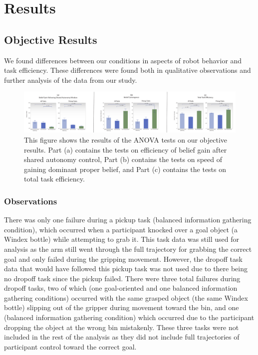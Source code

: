 \documentclass[conference]{IEEEtran}
\begin{document}
\section{Results}

\subsection{Objective Results}

We found differences between our conditions in aspects of robot behavior and task efficiency. These differences were found both in qualitative observations and further analysis of the data from our study.

\begin{figure}
\includegraphics[width=\textwidth]{figures/CR_All_Measures.pdf}
\caption{This figure shows the results of the ANOVA tests on our objective results. Part (a) contains the tests on efficiency of belief gain after shared autonomy control, Part (b) contains the tests on speed of gaining dominant proper belief, and Part (c) contains the tests on total task efficiency.}
\label{picture_results}
\end{figure}

\subsubsection{Observations}
There was only one failure during a pickup task (balanced information gathering condition), which occurred when a participant knocked over a goal object (a Windex bottle) while attempting to grab it. This task data was still used for analysis as the arm still went through the full trajectory for grabbing the correct goal and only failed during the gripping movement. However, the dropoff task data that would have followed this pickup task was not used due to there being no dropoff task since the pickup failed. There were three total failures during dropoff tasks, two of which (one goal-oriented and one balanced information gathering conditions) occurred with the same grasped object (the same Windex bottle) slipping out of the gripper during movement toward the bin, and one (balanced information gathering condition) which occurred due to the participant dropping the object at the wrong bin mistakenly. These three tasks were not included in the rest of the analysis as they did not include full trajectories of participant control toward the correct goal.
\end{document}
